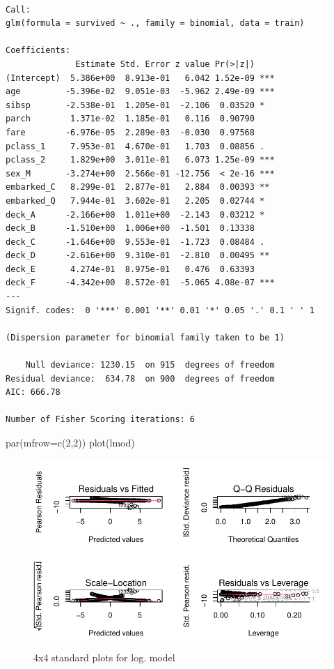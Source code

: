 \documentclass[
  letterpaper,
  DIV=11,
  numbers=noendperiod]{scrartcl}
\newenvironment{Shaded}{\begin{snugshade}}{\end{snugshade}}
\newcommand{\AttributeTok}[1]{\textcolor[rgb]{0.40,0.45,0.13}{#1}}
\newcommand{\DecValTok}[1]{\textcolor[rgb]{0.68,0.00,0.00}{#1}}
\newcommand{\FunctionTok}[1]{\textcolor[rgb]{0.28,0.35,0.67}{#1}}
\newcommand{\NormalTok}[1]{\textcolor[rgb]{0.00,0.23,0.31}{#1}}
\begin{document}
\begin{verbatim}

Call:
glm(formula = survived ~ ., family = binomial, data = train)

Coefficients:
              Estimate Std. Error z value Pr(>|z|)    
(Intercept)  5.386e+00  8.913e-01   6.042 1.52e-09 ***
age         -5.396e-02  9.051e-03  -5.962 2.49e-09 ***
sibsp       -2.538e-01  1.205e-01  -2.106  0.03520 *  
parch        1.371e-02  1.185e-01   0.116  0.90790    
fare        -6.976e-05  2.289e-03  -0.030  0.97568    
pclass_1     7.953e-01  4.670e-01   1.703  0.08856 .  
pclass_2     1.829e+00  3.011e-01   6.073 1.25e-09 ***
sex_M       -3.274e+00  2.566e-01 -12.756  < 2e-16 ***
embarked_C   8.299e-01  2.877e-01   2.884  0.00393 ** 
embarked_Q   7.944e-01  3.602e-01   2.205  0.02744 *  
deck_A      -2.166e+00  1.011e+00  -2.143  0.03212 *  
deck_B      -1.510e+00  1.006e+00  -1.501  0.13338    
deck_C      -1.646e+00  9.553e-01  -1.723  0.08484 .  
deck_D      -2.616e+00  9.310e-01  -2.810  0.00495 ** 
deck_E       4.274e-01  8.975e-01   0.476  0.63393    
deck_F      -4.342e+00  8.572e-01  -5.065 4.08e-07 ***
---
Signif. codes:  0 '***' 0.001 '**' 0.01 '*' 0.05 '.' 0.1 ' ' 1

(Dispersion parameter for binomial family taken to be 1)

    Null deviance: 1230.15  on 915  degrees of freedom
Residual deviance:  634.78  on 900  degrees of freedom
AIC: 666.78

Number of Fisher Scoring iterations: 6
\end{verbatim}

\begin{Shaded}
\begin{Highlighting}[]
\FunctionTok{par}\NormalTok{(}\AttributeTok{mfrow=}\FunctionTok{c}\NormalTok{(}\DecValTok{2}\NormalTok{,}\DecValTok{2}\NormalTok{))}
\FunctionTok{plot}\NormalTok{(lmod)}
\end{Highlighting}
\end{Shaded}

\begin{figure}[H]

{\centering \includegraphics{FinalProject_files/figure-pdf/unnamed-chunk-21-1.pdf}

}

\caption{4x4 standard plots for log. model}

\end{figure}%
\end{document}
